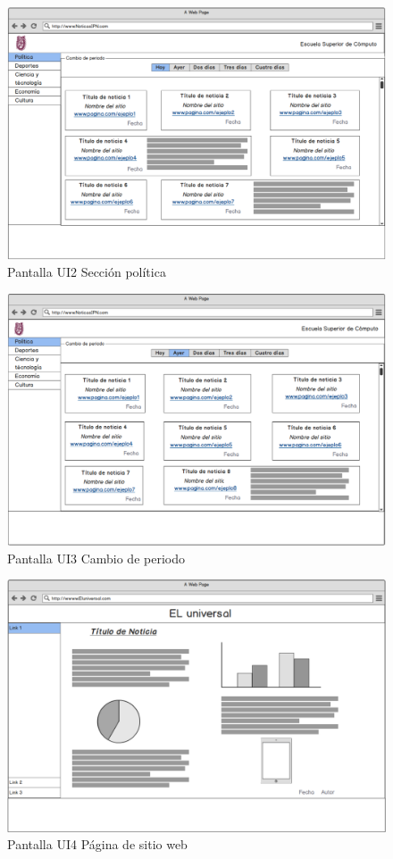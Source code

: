 \begin{figure}[H]
  \centering 
	\includegraphics[scale=.35]{imagenes/Pantallas/UI2}
  \caption{Pantalla UI2 Sección política}
  \label{fig:UI2}
\end{figure}



\begin{figure}[H]
  \centering
	\includegraphics[scale=.35]{imagenes/Pantallas/UI3}
  \caption{Pantalla UI3 Cambio de periodo}
  \label{fig:UI3}
\end{figure}


\begin{figure}[H]
  \centering
	\includegraphics[scale=.35]{imagenes/Pantallas/UI4}
  \caption{Pantalla UI4 Página de sitio web}
  \label{fig:UI4}
\end{figure}